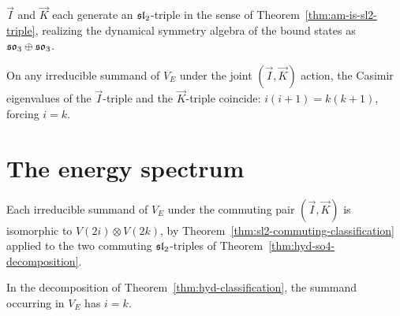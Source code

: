 \begin{theorem}
  \label{thm:hyd-so4-decomposition}
  \leanok
  $\vec I$ and $\vec K$ each generate an $\mathfrak{sl}_2$-triple in the sense of
  Theorem~\ref{thm:am-is-sl2-triple}, realizing the dynamical symmetry
  algebra of the bound states as $\mathfrak{so}_3 \oplus \mathfrak{so}_3$.
\end{theorem}

\begin{theorem}
  \label{thm:hyd-equal-casimirs}
  \leanok
  On any irreducible summand of $V_E$ under the joint $(\vec I, \vec K)$
  action, the Casimir eigenvalues of the $\vec I$-triple and the $\vec
  K$-triple coincide: $i(i+1) = k(k+1)$, forcing $i=k$.
\end{theorem}

\section{The energy spectrum}
\label{sec:hyd-spectrum}

\begin{theorem}
  \label{thm:hyd-classification}
  \leanok
  Each irreducible summand of $V_E$ under the commuting pair
  $(\vec I,\vec K)$ is isomorphic to $V(2i)\otimes V(2k)$, by
  Theorem~\ref{thm:sl2-commuting-classification} applied to the two
  commuting $\mathfrak{sl}_2$-triples of Theorem~\ref{thm:hyd-so4-decomposition}.
\end{theorem}

\begin{theorem}
  \label{thm:hyd-equal-hw}
  \leanok
  In the decomposition of Theorem~\ref{thm:hyd-classification}, the summand
  occurring in $V_E$ has $i = k$.
\end{theorem}

